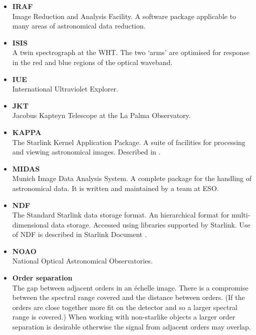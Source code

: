 \documentclass[twoside,11pt]{starlink}
\begin{document}
\begin{itemize}
\item {\bf\label{gl_iraf}IRAF}\\
      Image Reduction and Analysis Facility.  A software package
      applicable to many areas of astronomical data reduction.

\item {\bf\label{gl_isis}ISIS}\\
      A twin spectrograph at the WHT.  The two `arms' are optimised
      for response in the red and blue regions of the optical waveband.

\item {\bf\label{gl_iue}IUE}\\
      International Ultraviolet Explorer.

\item {\bf\label{gl_jkt}JKT}\\
      Jacobus Kapteyn Telescope at the La Palma Observatory.

\item {\bf\label{gl_kappa}KAPPA}\\
      The Starlink Kernel Application Package.  A suite of facilities
      for processing and viewing astronomical images.
      Described in .

\item {\bf\label{gl_midas}MIDAS}\\
      Munich Image Data Analysis System.  A complete package for the
      handling of astronomical data.
      It is written and maintained by a team at ESO.

\item {\bf\label{gl_ndf}NDF}\\
      The Standard Starlink data storage format.  An hierarchical format for
      multi-dimensional data storage.  Accessed using libraries supported
      by Starlink.  Use of NDF is described in Starlink Document
      \cite{ndf}.

\item {\bf\label{gl_noao}NOAO}\\
      National Optical Astronomical Observatories.

\item {\bf\label{gl_order_separation}Order separation}\\
      The gap between adjacent orders in an \'{e}chelle image.
      There is a compromise between the spectral range covered and the
      distance between orders.  (If the orders are close together more fit
      on the detector and so a larger spectral range is covered.)
      When working with non-starlike objects a larger order separation
      is desirable otherwise the signal from adjacent orders may overlap.


\end{itemize}
\end{document}
